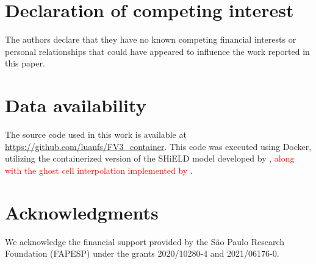 \documentclass[preprint,12pt]{elsarticle}
\begin{document}
\begin{linenumbers}
\section*{Declaration of competing interest}
The authors declare that they have no known competing financial interests or personal relationships that could have appeared to influence the work reported in this paper.

\section*{Data availability}
The source code used in this work is available at \url{https://github.com/luanfs/FV3_container}.
This code was executed using Docker, utilizing the containerized
version of the SHiELD model developed by \cite{cheng:2022},
\textcolor{red}{along with the ghost cell interpolation implemented by \cite{mouallem:2023}}.

\section*{Acknowledgments}
We acknowledge the financial support provided by the São Paulo Research Foundation (FAPESP) under the grants 2020/10280-4 and 2021/06176-0.



\appendix

\end{linenumbers}
\end{document}

